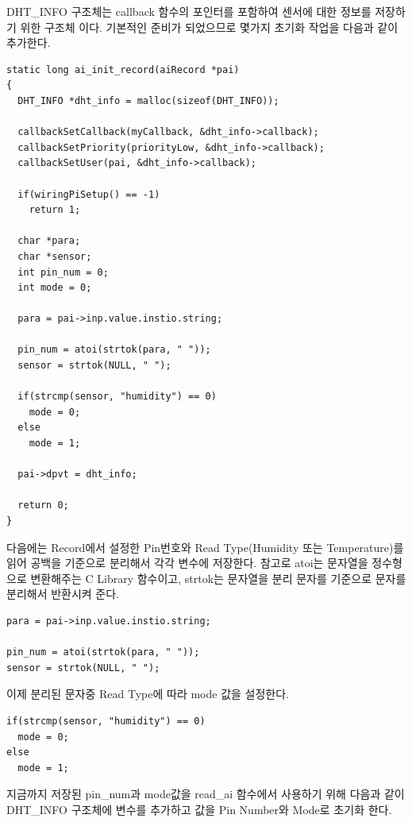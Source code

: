 \documentclass[11pt
  , a4paper
  , article
  , oneside
]{memoir}
\begin{document}
DHT\_INFO 구조체는 callback 함수의 포인터를 포함하여 센서에 대한 정보를 저장하기 위한 구조체 이다.
기본적인 준비가 되었으므로 몇가지 초기화 작업을 다음과 같이 추가한다.
\begin{lstlisting}[style=termstylenumber, caption={Editing \texttt{/etc/fai/NFSROOT}}, label={list:nfsroot-file}]
static long ai_init_record(aiRecord *pai)
{
  DHT_INFO *dht_info = malloc(sizeof(DHT_INFO));

  callbackSetCallback(myCallback, &dht_info->callback);
  callbackSetPriority(priorityLow, &dht_info->callback);
  callbackSetUser(pai, &dht_info->callback);

  if(wiringPiSetup() == -1)
    return 1;

  char *para;
  char *sensor;
  int pin_num = 0;
  int mode = 0;

  para = pai->inp.value.instio.string;

  pin_num = atoi(strtok(para, " "));
  sensor = strtok(NULL, " ");

  if(strcmp(sensor, "humidity") == 0)
    mode = 0;
  else
    mode = 1;

  pai->dpvt = dht_info;
  
  return 0;
}
\end{lstlisting}
다음에는 Record에서 설정한 Pin번호와 Read Type(Humidity 또는 Temperature)를 읽어 공백을 기준으로 분리해서
각각 변수에 저장한다. 참고로 atoi는 문자열을 정수형으로 변환해주는 C Library 함수이고, strtok는 문자열을
분리 문자를 기준으로 문자를 분리해서 반환시켜 준다.
\begin{lstlisting}[style=termstyle]
para = pai->inp.value.instio.string;

pin_num = atoi(strtok(para, " "));
sensor = strtok(NULL, " ");
\end{lstlisting}
이제 분리된 문자중 Read Type에 따라 mode 값을 설정한다.
\begin{lstlisting}[style=termstyle]
if(strcmp(sensor, "humidity") == 0)
  mode = 0;
else
  mode = 1;
\end{lstlisting}
지금까지 저장된 pin\_num과 mode값을 read\_ai 함수에서 사용하기 위해 다음과 같이 DHT\_INFO 구조체에 
변수를 추가하고 값을 Pin Number와 Mode로 초기화 한다.
\end{document}
